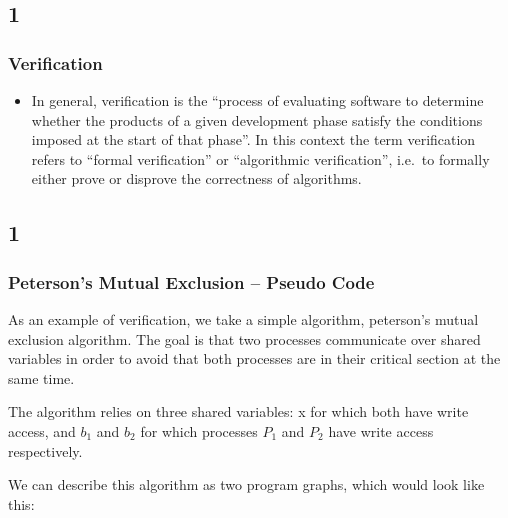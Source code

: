 \documentclass[handout]{beamer}
\begin{document}
\begin{footnotesize}
\subsection*{1}
\begin{frame}
  \frametitle{Verification}
  \begin{itemize}
  \item
  In general, verification is the ``process of evaluating software to determine whether the products of a given development phase satisfy the conditions imposed at the start of that phase''. In this context the term verification refers to ``formal verification'' or ``algorithmic verification'', i.e.\ to formally either prove or disprove the correctness of algorithms.
  \end{itemize}
\end{frame}

\subsection*{1}
\begin{frame}
  \frametitle{Peterson's Mutual Exclusion -- Pseudo Code}
As an example of verification, we take a simple algorithm, peterson's mutual exclusion algorithm. The goal is that two processes communicate over shared variables in order to avoid that both processes are in their critical section at the same time.

The algorithm relies on three shared variables: x for which both have write access, and $b_1$ and $b_2$ for which processes $P_1$ and $P_2$ have write access respectively.

We can describe this algorithm as two program graphs, which would look like this:
\end{frame}


\end{footnotesize}
\end{document}

